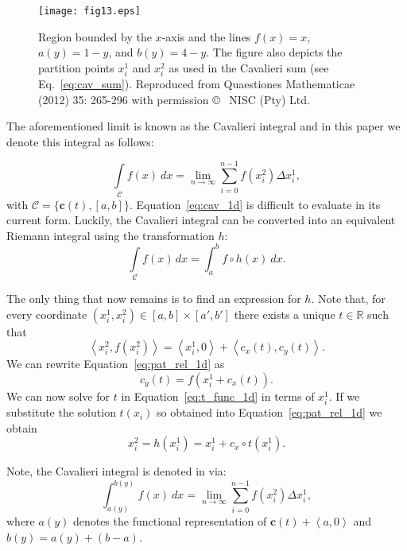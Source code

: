 \documentclass{article}
\theoremstyle{theorem}
\theoremstyle{definition}
\begin{document}
\begin{figure}[htb]
\centering
\texttt{[image: fig13.eps]}
\caption{Region bounded by the $x$-axis and the lines $f(x)=x$, $a(y)=1-y$, and $b(y)=4-y$. The figure also depicts the partition points $x_i^1$ and $x_i^2$ as used in the Cavalieri sum (see Eq.~\eqref{eq:cav_sum}). Reproduced from Quaestiones Mathematicae (2012) 35: 265-296 with permission \copyright~ NISC (Pty) Ltd.}
\label{fig:caval2}
\end{figure}

\noindent
The aforementioned limit is known as the Cavalieri integral and in this paper we denote this integral as follows:

\begin{equation}
\label{eq:cav_1d}
\int \limits_{\mathcal{C}} f(x)~dx = \lim_{n \rightarrow \infty}  \sum_{i=0}^{n-1} f(x_i^2) \Delta x_i^1,
\end{equation}
with $\mathcal{C} = \{\mathbf{c}(t),[a,b]\}$. Equation~\eqref{eq:cav_1d} is difficult to evaluate in its current form. Luckily, the Cavalieri integral 
can be converted into an equivalent Riemann integral using the transformation $h$:
 \begin{equation}
 \int \limits_{\mathcal{C}} f(x)\, dx = \int_{a}^{b} f\circ h(x)~dx. 
\end{equation}

\noindent
The only thing that now remains is to find an expression for $h$. Note that, for every coordinate $(x_i^1,x_i^2) \in [a,b] \times [a',b']$ there exists a unique $t\in\mathbb{R}$ such that
\begin{equation}
 \label{eq:pat_rel_1d}
 \left <x_i^2,f(x_i^2) \right > = \left <x_i^1,0 \right> + \left<c_x(t),c_y(t) \right >.
 \end{equation}
 We can rewrite Equation~\eqref{eq:pat_rel_1d} as
 \begin{equation}
 \label{eq:t_func_1d}
 c_y(t) = f(x_i^1 + c_x(t)).
 \end{equation}
 We can now solve for $t$ in Equation~\eqref{eq:t_func_1d} in terms of $x_i^1$. If we substitute the solution $t(x_i)$ so obtained into Equation~\ref{eq:pat_rel_1d} we obtain 
\begin{equation}
\label{eq:h_func_1d}
 x_i^2 = h(x_i^1) = x_i^1 + c_x\circ t(x_i^1).
\end{equation}

\noindent
Note, the Cavalieri integral is denoted in \cite{ackermann12} via:
\begin{equation}
\label{eq:cav_1d}
\int_{a(y)}^{b(y)} f(x)~dx = \lim_{n \rightarrow \infty}  \sum_{i=0}^{n-1} f(x_i^2) \Delta x_i^1,
\end{equation}
where $a(y)$ denotes the functional representation of $\mathbf{c}(t) + \left <a,0 \right >$ and $b(y) = a(y)+(b-a)$.
\end{document}
